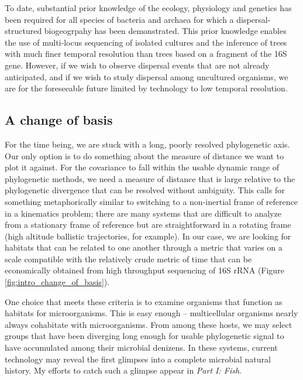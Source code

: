 To date, substantial prior knowledge of the ecology, physiology and genetics has been required for all species of bacteria and archaea for which a dispersal-structured biogeogrpahy has been demonstrated. This prior knowledge enables the use of multi-locus sequencing of isolated cultures and the inference of trees with much finer temporal resolution than trees based on a fragment of the 16S gene. However, if we wish to observe dispersal events that are not already anticipated, and if we wish to study dispersal among uncultured organisms, we are for the foreseeable future limited by technology to low temporal resolution.

\subsection*{A change of basis}

For the time being, we are stuck with a long, poorly resolved phylogenetic axis. Our only option is to do something about the measure of distance we want to plot it against. For the covariance to fall within the usable dynamic range of phylogenetic methods, we need a measure of distance that is large relative to the phylogenetic divergence that can be resolved without ambiguity. This calls for something metaphorically similar to switching to a non-inertial frame of reference in a kinematics problem; there are many systems that are difficult to analyze from a stationary frame of reference but are straightforward in a rotating frame (high altitude ballistic trajectories, for example). In our case, we are looking for habitats that can be related to one another through a metric that varies on a scale compatible with the relatively crude metric of time that can be economically obtained from high throughput sequencing of 16S rRNA (Figure \ref{fig:intro_change_of_basis}).



One choice that meets these criteria is to examine organisms that function as habitats for microorganisms. This is easy enough -- multicellular organisms nearly always cohabitate with microorganisms. From among these hosts, we may select groups that have been diverging long enough for usable phylogenetic signal to have accumulated among their microbial denizens. In these systems, current technology may reveal the first glimpses into a complete microbial natural history. My efforts to catch such a glimpse appear in {\em Part I: Fish}.

